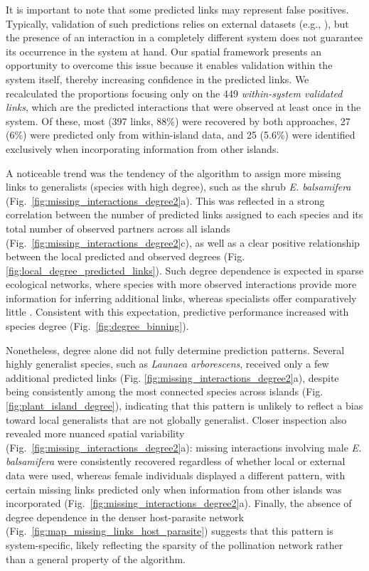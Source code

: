 \documentclass[oneside, a4paper, onecolumn, 11pt]{article}
\newcommand{\revtag}[1]{\textcolor{softcoral}{[#1]}}
\begin{document}
It is important to note that some predicted links may represent false positives. Typically, validation of such predictions relies on external datasets (e.g., \cite{Stock2021-do,Strydom2022-fe}), but the presence of an interaction in a completely different system does not guarantee its occurrence in the system at hand. Our spatial framework presents an opportunity to overcome this issue because it enables validation within the system itself, thereby increasing confidence in the predicted links. We recalculated the proportions focusing only on the 449 \textit{within-system validated links}, which are the predicted interactions that were observed at least once in the system. Of these, most (397 links, 88\%) were recovered by both approaches, 27 (6\%) were predicted only from within-island data, and 25 (5.6\%) were identified exclusively when incorporating information from other islands. 

A noticeable trend was the tendency of the algorithm to assign more missing links to generalists (species with high degree), such as the shrub \textit{E. balsamifera} (Fig.~\ref{fig:missing_interactions_degree2}a). This was reflected in a strong correlation between the number of predicted links assigned to each species and its total number of observed partners across all islands (Fig.~\ref{fig:missing_interactions_degree2}c), as well as a clear positive relationship between the local predicted and observed degrees (Fig. \ref{fig:local_degree_predicted_links}). %
Such degree dependence is expected in sparse ecological networks, where species with more observed interactions provide more information for inferring additional links, whereas specialists offer comparatively little \citep{Biton2025-jj}. Consistent with this expectation, predictive performance increased with species degree (Fig.~\ref{fig:degree_binning}).%

Nonetheless, degree alone did not fully determine prediction patterns. Several highly generalist species, such as \textit{Launaea arborescens}, received only a few additional predicted links (Fig. \ref{fig:missing_interactions_degree2}a), despite being consistently among the most connected species across islands (Fig. \ref{fig:plant_island_degree}), indicating that this pattern is unlikely to reflect a bias toward local generalists that are not globally generalist. %
Closer inspection also revealed more nuanced spatial variability (Fig.~\ref{fig:missing_interactions_degree2}a): missing interactions involving male \textit{E. balsamifera} were consistently recovered regardless of whether local or external data were used, whereas female individuals displayed a different pattern, with certain missing links predicted only when information from other islands was incorporated (Fig.~\ref{fig:missing_interactions_degree2}a). Finally, the absence of degree dependence in the denser host-parasite network (Fig.~\ref{fig:map_missing_links_host_parasite}) suggests that this pattern is system-specific, likely reflecting the sparsity of the pollination network rather than a general property of the algorithm. %
\end{document}
